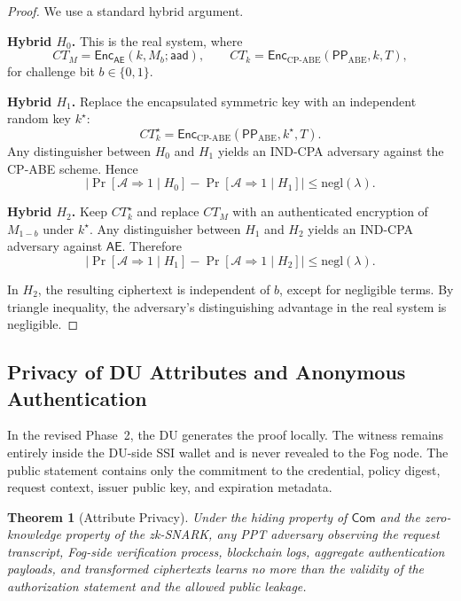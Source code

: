 \documentclass[conference]{IEEEtran}
\newtheorem{theorem}{Theorem}
\begin{document}
\begin{proof}
We use a standard hybrid argument.

\textbf{Hybrid $H_0$.} This is the real system, where
\[
CT_M = \textsf{Enc}_{\textsf{AE}}(k,M_b;\textsf{aad}),\qquad
CT_k = \textsf{Enc}_{\mathrm{CP\text{-}ABE}}(\mathsf{PP}_{\mathrm{ABE}},k,T),
\]
for challenge bit $b\in\{0,1\}$.

\textbf{Hybrid $H_1$.} Replace the encapsulated symmetric key with an independent random key $k^\star$:
\[
CT_k^\star = \textsf{Enc}_{\mathrm{CP\text{-}ABE}}(\mathsf{PP}_{\mathrm{ABE}},k^\star,T).
\]
Any distinguisher between $H_0$ and $H_1$ yields an IND-CPA adversary against the CP-ABE scheme. Hence
\[
\left|\Pr[\mathcal{A}\Rightarrow 1 \mid H_0]-\Pr[\mathcal{A}\Rightarrow 1 \mid H_1]\right|
\le \mathrm{negl}(\lambda).
\]

\textbf{Hybrid $H_2$.} Keep $CT_k^\star$ and replace $CT_M$ with an authenticated encryption of $M_{1-b}$ under $k^\star$. Any distinguisher between $H_1$ and $H_2$ yields an IND-CPA adversary against $\textsf{AE}$. Therefore
\[
\left|\Pr[\mathcal{A}\Rightarrow 1 \mid H_1]-\Pr[\mathcal{A}\Rightarrow 1 \mid H_2]\right|
\le \mathrm{negl}(\lambda).
\]

In $H_2$, the resulting ciphertext is independent of $b$, except for negligible terms. By triangle inequality, the adversary's distinguishing advantage in the real system is negligible.
\end{proof}

\subsection{Privacy of DU Attributes and Anonymous Authentication}

In the revised Phase~2, the DU generates the proof locally. The witness remains entirely inside the DU-side SSI wallet and is never revealed to the Fog node. The public statement contains only the commitment to the credential, policy digest, request context, issuer public key, and expiration metadata.

\begin{theorem}[Attribute Privacy]
Under the hiding property of $\mathsf{Com}$ and the zero-knowledge property of the zk-SNARK, any PPT adversary observing the request transcript, Fog-side verification process, blockchain logs, aggregate authentication payloads, and transformed ciphertexts learns no more than the validity of the authorization statement and the allowed public leakage.
\end{theorem}
\end{document}
